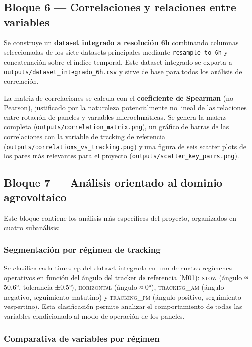 \documentclass[12pt, a4paper]{article}
\begin{document}
\subsection{Bloque 6 — Correlaciones y relaciones entre variables}

Se construye un \textbf{dataset integrado a resolución 6h} combinando columnas seleccionadas de los siete datasets principales mediante \texttt{resample\_to\_6h} y concatenación sobre el índice temporal. Este dataset integrado se exporta a \texttt{outputs/dataset\_integrado\_6h.csv} y sirve de base para todos los análisis de correlación.

La matriz de correlaciones se calcula con el \textbf{coeficiente de Spearman} (no Pearson), justificado por la naturaleza potencialmente no lineal de las relaciones entre rotación de paneles y variables microclimáticas. Se genera la matriz completa (\texttt{outputs/correlation\_matrix.png}), un gráfico de barras de las correlaciones con la variable de tracking de referencia (\texttt{outputs/correlations\_vs\_tracking.png}) y una figura de seis scatter plots de los pares más relevantes para el proyecto (\texttt{outputs/scatter\_key\_pairs.png}).

\subsection{Bloque 7 — Análisis orientado al dominio agrovoltaico}

Este bloque contiene los análisis más específicos del proyecto, organizados en cuatro subanálisis:

\subsubsection{Segmentación por régimen de tracking}

Se clasifica cada timestep del dataset integrado en uno de cuatro regímenes operativos en función del ángulo del tracker de referencia (M01): \textsc{stow} (ángulo ≈ 50.6°, tolerancia ±0.5°), \textsc{horizontal} (ángulo ≈ 0°), \textsc{tracking\_am} (ángulo negativo, seguimiento matutino) y \textsc{tracking\_pm} (ángulo positivo, seguimiento vespertino). Esta clasificación permite analizar el comportamiento de todas las variables condicionado al modo de operación de los paneles.

\subsubsection{Comparativa de variables por régimen}
\end{document}
